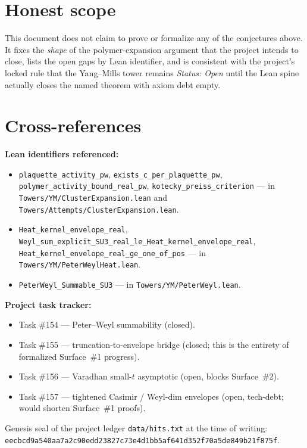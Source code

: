 \documentclass{article}
\begin{document}
\section{Honest scope}

This document does not claim to prove or formalize any of the
conjectures above. It fixes the \emph{shape} of the polymer-expansion
argument that the project intends to close, lists the open gaps by
Lean identifier, and is consistent with the project's locked rule
that the Yang--Mills tower remains \emph{Status: Open} until the Lean
spine actually closes the named theorem with axiom debt empty.

\section*{Cross-references}

\noindent\textbf{Lean identifiers referenced:}
\begin{itemize}
  \item \texttt{plaquette\_activity\_pw}, \texttt{exists\_c\_per\_plaquette\_pw},
        \texttt{polymer\_activity\_bound\_real\_pw},
        \texttt{kotecky\_preiss\_criterion}
        --- in \texttt{Towers/YM/ClusterExpansion.lean} and
        \texttt{Towers/Attempts/ClusterExpansion.lean}.
  \item \texttt{Heat\_kernel\_envelope\_real},
        \texttt{Weyl\_sum\_explicit\_SU3\_real\_le\_Heat\_kernel\_envelope\_real},
        \texttt{Heat\_kernel\_envelope\_real\_ge\_one\_of\_pos}
        --- in \texttt{Towers/YM/PeterWeylHeat.lean}.
  \item \texttt{PeterWeyl\_Summable\_SU3} --- in
        \texttt{Towers/YM/PeterWeyl.lean}.
\end{itemize}

\noindent\textbf{Project task tracker:}
\begin{itemize}
  \item Task \#154 --- Peter--Weyl summability (closed).
  \item Task \#155 --- truncation-to-envelope bridge (closed; this
        is the entirety of formalized Surface~\#1 progress).
  \item Task \#156 --- Varadhan small-$t$ asymptotic (open, blocks
        Surface~\#2).
  \item Task \#157 --- tightened Casimir / Weyl-dim envelopes
        (open, tech-debt; would shorten Surface~\#1 proofs).
\end{itemize}

\noindent Genesis seal of the project ledger
\texttt{data/hits.txt} at the time of writing:
\texttt{eecbcd9a540aa7a2c90edd23827c73e4d1bb5af641d352f70a5de849b21f875f}.
\end{document}
